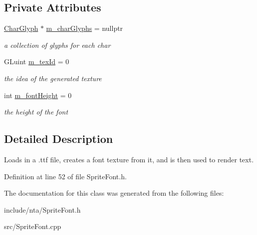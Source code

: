 \subsection*{Private Attributes}
\begin{DoxyCompactItemize}
\item 
\mbox{\label{classnta_1_1SpriteFont_a2fa17cff4bb7bd5125a01dcfa9b0fa88}} 
\hyperlink{structnta_1_1CharGlyph}{Char\+Glyph} $\ast$ \hyperlink{classnta_1_1SpriteFont_a2fa17cff4bb7bd5125a01dcfa9b0fa88}{m\+\_\+char\+Glyphs} = nullptr
\begin{DoxyCompactList}\small\item\em a collection of glyphs for each char \end{DoxyCompactList}\item 
\mbox{\label{classnta_1_1SpriteFont_ab74d460c526a4df82d206bba945fd711}} 
G\+Luint \hyperlink{classnta_1_1SpriteFont_ab74d460c526a4df82d206bba945fd711}{m\+\_\+tex\+Id} = 0
\begin{DoxyCompactList}\small\item\em the idea of the generated texture \end{DoxyCompactList}\item 
\mbox{\label{classnta_1_1SpriteFont_a689c80716d73871ea0d9abe08af9e8dc}} 
int \hyperlink{classnta_1_1SpriteFont_a689c80716d73871ea0d9abe08af9e8dc}{m\+\_\+font\+Height} = 0
\begin{DoxyCompactList}\small\item\em the height of the font \end{DoxyCompactList}\end{DoxyCompactItemize}


\subsection{Detailed Description}
Loads in a .ttf file, creates a font texture from it, and is then used to render text. 

Definition at line 52 of file Sprite\+Font.\+h.



The documentation for this class was generated from the following files\+:\begin{DoxyCompactItemize}
\item 
include/nta/Sprite\+Font.\+h\item 
src/Sprite\+Font.\+cpp\end{DoxyCompactItemize}
